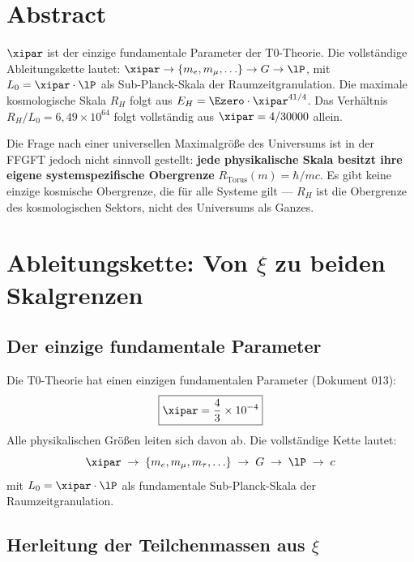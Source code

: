 \section*{Abstract}

$\xipar$ ist der einzige fundamentale Parameter der T0-Theorie. Die vollständige Ableitungskette lautet: $\xipar \to \{m_e, m_\mu, \ldots\} \to G \to \lP$, mit $L_0 = \xipar \cdot \lP$ als Sub-Planck-Skala der Raumzeitgranulation. Die maximale kosmologische Skala $R_H$ folgt aus $E_H = \Ezero \cdot \xipar^{41/4}$. Das Verhältnis $R_H/L_0 = 6{,}49 \times 10^{64}$ folgt vollständig aus $\xipar = 4/30000$ allein.

Die Frage nach einer universellen Maximalgröße des Universums ist in der FFGFT jedoch nicht sinnvoll gestellt: \textbf{jede physikalische Skala besitzt ihre eigene systemspezifische Obergrenze} $R_\text{Torus}(m) = \hbar/mc$. Es gibt keine einzige kosmische Obergrenze, die für alle Systeme gilt — $R_H$ ist die Obergrenze des kosmologischen Sektors, nicht des Universums als Ganzes.

\section{Ableitungskette: Von \texorpdfstring{$\xi$}{xi} zu beiden Skalgrenzen}

\subsection{Der einzige fundamentale Parameter}

Die T0-Theorie hat einen einzigen fundamentalen Parameter (Dokument 013):
\begin{equation}
	\boxed{\xipar = \frac{4}{3} \times 10^{-4}}
\end{equation}
Alle physikalischen Größen leiten sich davon ab. Die vollständige Kette lautet:
\begin{equation}
	\xipar \;\to\; \{m_e, m_\mu, m_\tau, \ldots\} \;\to\; G \;\to\; \lP \;\to\; c
\end{equation}
mit $L_0 = \xipar \cdot \lP$ als fundamentale Sub-Planck-Skala der Raumzeitgranulation.

\subsection{Herleitung der Teilchenmassen aus \texorpdfstring{$\xi$}{xi}}

